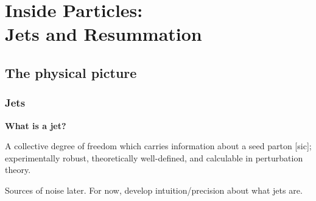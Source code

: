 \chapter[Inside Particles: Jets and Resummation]{Inside Particles:\\Jets and Resummation}


\section{The physical picture}



\subsection{Jets}
\textbf{What is a \gls{jet}?}

A collective degree of freedom which carries information about a seed parton [sic];
%
experimentally robust, theoretically well-defined, and calculable in perturbation theory.

Sources of noise later.
%
For now, develop intuition/precision about what jets are.




